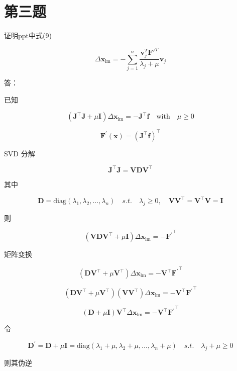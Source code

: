 \documentclass[12pt,a4paper,utf8]{article}
\begin{document}
\section*{第三题}

证明ppt中式(9) 

$$
\Delta \mathbf{x}_{\text{lm}} = 
-\sum_{j=1}^n \frac{\mathbf{v}_j^T \mathbf{F'}^T}{\lambda_j+\mu} \mathbf{v}_j
$$

答：\newline

已知

$$
\left(\mathbf{J}^{\top} \mathbf{J} + \mu \mathbf{I}\right) \Delta \mathbf{x}_{\operatorname{lm}} = -\mathbf{J}^{\top} \mathbf{f} \quad 
\text{with} \quad \mu \geq 0
$$

$$
\mathbf{F}^{\prime}(\mathbf{x}) = \left(\mathbf{J}^{\top} \mathbf{f}\right)^{\top}
$$

SVD 分解

$$
\mathbf{J}^{\top} \mathbf{J} = \mathbf{V} \mathbf{D} \mathbf{V}^{\top} 
$$

其中

$$
\mathbf{D} = \text{diag}(\lambda_1, \lambda_2, \ldots , \lambda_n)
\quad s.t. \quad \lambda_j \geq 0, \quad 
\mathbf{V} \mathbf{V}^{\top} = \mathbf{V}^{\top} \mathbf{V} = \mathbf{I}
$$

则

$$
\left(\mathbf{V} \mathbf{D} \mathbf{V}^{\top} + \mu \mathbf{I}\right) 
\Delta \mathbf{x}_{\operatorname{lm}} = 
-{\mathbf{F}^{\prime}}^{\top}
$$

矩阵变换

$$
\left(\mathbf{D} \mathbf{V}^{\top} + \mu \mathbf{V}^{\top}\right)
\Delta \mathbf{x}_{\operatorname{lm}} = 
-\mathbf{V}^{\top} {\mathbf{F}^{\prime}}^{\top}
$$

$$
\left(\mathbf{D} \mathbf{V}^{\top} + \mu \mathbf{V}^{\top}\right)
\left(\mathbf{V}\mathbf{V}^{\top}\right)
\Delta \mathbf{x}_{\operatorname{lm}} = 
-\mathbf{V}^{\top} {\mathbf{F}^{\prime}}^{\top}
$$

$$
\left(\mathbf{D} + \mu \mathbf{I}\right)\mathbf{V}^{\top}
\Delta \mathbf{x}_{\operatorname{lm}} = 
-\mathbf{V}^{\top} {\mathbf{F}^{\prime}}^{\top}
$$

令

$$
\mathbf{D}^{\prime} = \mathbf{D} + \mu \mathbf{I} = 
\text{diag}(\lambda_1 + \mu, \lambda_2 + \mu, \ldots , \lambda_n + \mu)
\quad s.t. \quad \lambda_j + \mu \geq 0
$$

则其伪逆\cite{Hartley:2003:MVG:861369}
\end{document}
